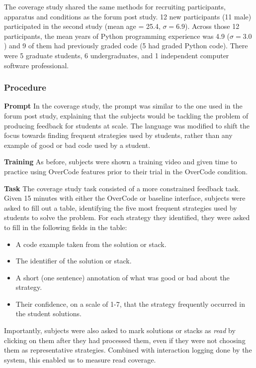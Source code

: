 The coverage study shared the same methods for recruiting participants, apparatus and conditions as the forum post study. 12 new participants (11 male) participated in the second study (mean age = 25.4, $\sigma = 6.9$). Across those 12 participants, the mean years of Python programming experience was 4.9 ($\sigma = 3.0$) and 9 of them had previously graded code (5 had graded Python code). There were 5 graduate students, 6 undergraduates, and 1 independent computer software professional.


\subsubsection{Procedure}
{\bf Prompt} In the coverage study, the prompt was similar to the one used in the forum post study, explaining that the subjects would be tackling the problem of producing feedback for students at scale. The language was modified to shift the focus towards finding frequent strategies used by students, rather than any example of good or bad code used by a student.

{\bf Training} As before, subjects were shown a training video and given time to practice using OverCode features prior to their trial in the OverCode condition.

{\bf Task} The coverage study task consisted of a more constrained feedback task. Given 15 minutes with either the OverCode or baseline interface, subjects were asked to fill out a table, identifying the five most frequent strategies used by students to solve the problem. For each strategy they identified, they were asked to fill in the following fields in the table:
\begin{itemize}
\item A code example taken from the solution or stack.
\item The identifier of the solution or stack.
\item A short (one sentence) annotation of what was good or bad about the strategy.
\item Their confidence, on a scale of 1-7, that the strategy frequently occurred in the student solutions.
\end{itemize}
Importantly, subjects were also asked to mark solutions or stacks as \emph{read} by clicking on them after they had processed them, even if they were not choosing them as representative strategies. Combined with interaction logging done by the system, this enabled us to measure read coverage.

